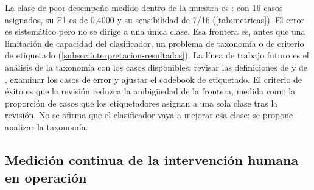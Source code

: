 La clase de peor desempeño medido dentro de la muestra es : con 16 casos asignados, su F1 es de 0,4000 y su sensibilidad de 7/16 (\autoref{tab:metricas}). El error es sistemático pero no se dirige a una única clase. Esa frontera es, antes que una limitación de capacidad del clasificador, un problema de taxonomía o de criterio de etiquetado (\autoref{subsec:interpretacion-resultados}). La línea de trabajo futuro es el análisis de la taxonomía con los casos disponibles: revisar las definiciones de  y de , examinar los casos de error y ajustar el codebook de etiquetado. El criterio de éxito es que la revisión reduzca la ambigüedad de la frontera, medida como la proporción de casos que los etiquetadores asignan a una sola clase tras la revisión. No se afirma que el clasificador vaya a mejorar esa clase: se propone analizar la taxonomía.

\subsection{Medición continua de la intervención humana en operación}\label{subsec:medicion-intervencion}

